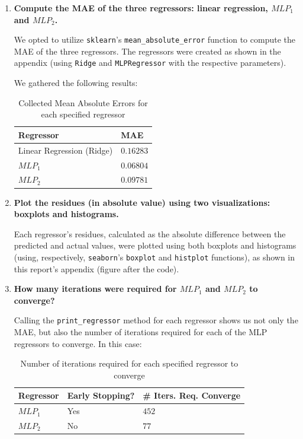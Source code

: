 \documentclass[12pt]{article}
\begin{document}
\begin{enumerate}[leftmargin=\labelsep,resume]
  \item \textbf{Compute the MAE of the three regressors: linear regression, $MLP_1$ and $MLP_2$.}

        We opted to utilize \texttt{sklearn}'s \texttt{mean\_absolute\_error} function to compute the MAE of the three regressors.
        The regressors were created as shown in the appendix (using \texttt{Ridge} and
        \texttt{MLPRegressor} with the respective parameters).

        We gathered the following results:

        \begin{table}[H]
          \centering
          \begin{tabular}{l|l}
            \textbf{Regressor}        & \textbf{MAE} \\ \hline
            Linear Regression (Ridge) & $0.16283$    \\
            $MLP_1$                   & $0.06804$    \\
            $MLP_2$                   & $0.09781$
          \end{tabular}
          \caption{Collected Mean Absolute Errors for each specified regressor}
          \label{tab:mean-absolute-errors}
        \end{table}

  \item \textbf{Plot the residues (in absolute value) using two visualizations: boxplots and histograms.}

        Each regressor's residues, calculated as the absolute difference between
        the predicted and actual values, were plotted using both boxplots and histograms
        (using, respectively, \texttt{seaborn}'s \texttt{boxplot} and \texttt{histplot} functions),
        as shown in this report's appendix (figure after the code).

  \item \textbf{How many iterations were required for $MLP_1$ and $MLP_2$ to converge?}

        Calling the \texttt{print\_regressor} method for each regressor shows us
        not only the MAE, but also the number of iterations required for each of
        the MLP regressors to converge. In this case:

        \begin{table}[H]
          \centering
          \begin{tabular}{l|l|l}
            \textbf{Regressor} & \textbf{Early Stopping?} & \textbf{\# Iters. Req. Converge} \\ \hline
            $MLP_1$            & Yes                      & $452$                            \\
            $MLP_2$            & No                       & $77$
          \end{tabular}
          \caption{Number of iterations required for each specified regressor to converge}
          \label{tab:iterations-required-converge}
        \end{table}


\end{enumerate}
\end{document}
